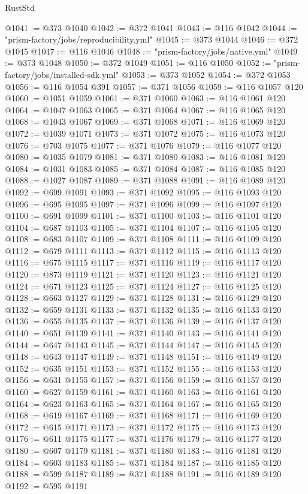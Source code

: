 \begin{lexlean}{RustStd}
\begin{coremodule}
@1041 := @373 @1040
@1042 := @372 @1041
@1043 := @116 @1042
@1044 := "prism-factory/jobs/reproducibility.yml"
@1045 := @373 @1044
@1046 := @372 @1045
@1047 := @116 @1046
@1048 := "prism-factory/jobs/native.yml"
@1049 := @373 @1048
@1050 := @372 @1049
@1051 := @116 @1050
@1052 := "prism-factory/jobs/installed-sdk.yml"
@1053 := @373 @1052
@1054 := @372 @1053
@1056 := @116 @1054 @391
@1057 := @371 @1056
@1059 := @116 @1057 @120
@1060 := @1051 @1059
@1061 := @371 @1060
@1063 := @116 @1061 @120
@1064 := @1047 @1063
@1065 := @371 @1064
@1067 := @116 @1065 @120
@1068 := @1043 @1067
@1069 := @371 @1068
@1071 := @116 @1069 @120
@1072 := @1039 @1071
@1073 := @371 @1072
@1075 := @116 @1073 @120
@1076 := @703 @1075
@1077 := @371 @1076
@1079 := @116 @1077 @120
@1080 := @1035 @1079
@1081 := @371 @1080
@1083 := @116 @1081 @120
@1084 := @1031 @1083
@1085 := @371 @1084
@1087 := @116 @1085 @120
@1088 := @1027 @1087
@1089 := @371 @1088
@1091 := @116 @1089 @120
@1092 := @699 @1091
@1093 := @371 @1092
@1095 := @116 @1093 @120
@1096 := @695 @1095
@1097 := @371 @1096
@1099 := @116 @1097 @120
@1100 := @691 @1099
@1101 := @371 @1100
@1103 := @116 @1101 @120
@1104 := @687 @1103
@1105 := @371 @1104
@1107 := @116 @1105 @120
@1108 := @683 @1107
@1109 := @371 @1108
@1111 := @116 @1109 @120
@1112 := @679 @1111
@1113 := @371 @1112
@1115 := @116 @1113 @120
@1116 := @675 @1115
@1117 := @371 @1116
@1119 := @116 @1117 @120
@1120 := @873 @1119
@1121 := @371 @1120
@1123 := @116 @1121 @120
@1124 := @671 @1123
@1125 := @371 @1124
@1127 := @116 @1125 @120
@1128 := @663 @1127
@1129 := @371 @1128
@1131 := @116 @1129 @120
@1132 := @659 @1131
@1133 := @371 @1132
@1135 := @116 @1133 @120
@1136 := @655 @1135
@1137 := @371 @1136
@1139 := @116 @1137 @120
@1140 := @651 @1139
@1141 := @371 @1140
@1143 := @116 @1141 @120
@1144 := @647 @1143
@1145 := @371 @1144
@1147 := @116 @1145 @120
@1148 := @643 @1147
@1149 := @371 @1148
@1151 := @116 @1149 @120
@1152 := @635 @1151
@1153 := @371 @1152
@1155 := @116 @1153 @120
@1156 := @631 @1155
@1157 := @371 @1156
@1159 := @116 @1157 @120
@1160 := @627 @1159
@1161 := @371 @1160
@1163 := @116 @1161 @120
@1164 := @623 @1163
@1165 := @371 @1164
@1167 := @116 @1165 @120
@1168 := @619 @1167
@1169 := @371 @1168
@1171 := @116 @1169 @120
@1172 := @615 @1171
@1173 := @371 @1172
@1175 := @116 @1173 @120
@1176 := @611 @1175
@1177 := @371 @1176
@1179 := @116 @1177 @120
@1180 := @607 @1179
@1181 := @371 @1180
@1183 := @116 @1181 @120
@1184 := @603 @1183
@1185 := @371 @1184
@1187 := @116 @1185 @120
@1188 := @599 @1187
@1189 := @371 @1188
@1191 := @116 @1189 @120
@1192 := @595 @1191

\end{coremodule}
\end{lexlean}
